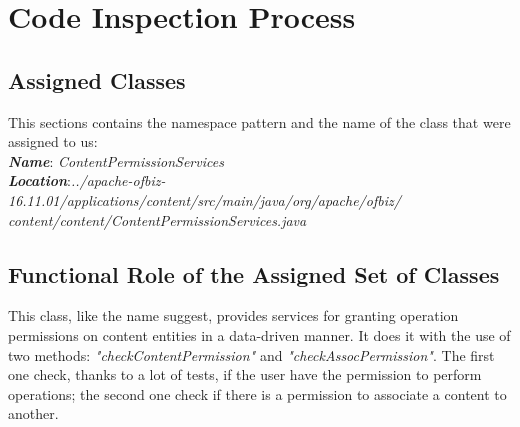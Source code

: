 \section{Code Inspection Process} \label{sec:code-proc}

\subsection{Assigned Classes}
This sections contains the namespace pattern and the name of the class that were assigned to us:\\

\textbf{\textit{Name}}: \textit{ContentPermissionServices}\\

\textbf{\textit{Location}}:\textit{../apache-ofbiz-16.11.01/applications/content/src/main/java/org/apache/ofbiz/\\
content/content/ContentPermissionServices.java}

\subsection{Functional Role of the Assigned  Set of Classes}
This class, like the name suggest, provides services for granting operation permissions on content entities in a data-driven manner. It does it with the use of two methods: \textit{"checkContentPermission"} and \textit{"checkAssocPermission"}. The first one check, thanks to a lot of tests, if the user have the permission to perform operations; the second one check if there is a permission to associate a content to another. 

